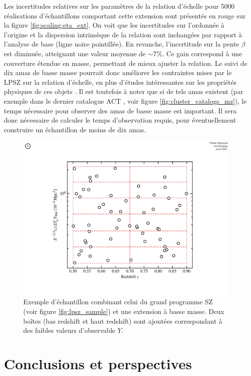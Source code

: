 Les incertitudes relatives sur les paramètres de la relation d'échelle pour 5000 réalisations d'échantillons comportant cette extension sont présentés en rouge sur la figure \ref{fig:scaling:eta_ext}.
On voit que les incertitudes sur l'ordonnée à l'origine et la dispersion intrinsèque de la relation sont inchangées par rapport à l'analyse de base (ligne noire pointillée).
En revanche, l'incertitude sur la pente $\beta$ est diminuée, atteignant une valeur moyenne de $\sim$7\%.
Ce gain correspond à une couverture étendue en masse, permettant de mieux ajuster la relation.
Le suivi de dix amas de basse masse pourrait donc améliorer les contraintes mises par le LPSZ sur la relation d'échelle, en plus d'études intéressantes sur les propriétés physiques de ces objets \cite{keruzore_exploiting_2020}.
Il est toutefois à noter que si de tels amas existent (par exemple dans le dernier catalogue ACT \cite{hilton_atacama_2021}, voir figure \ref{fig:cluster_catalogs_mz}), le temps nécessaire pour observer des amas de basse masse est important.
Il sera donc nécessaire de calculer le temps d'observation requis, pour éventuellement construire un échantillon de moins de dix amas.

\begin{figure}[t]
    \centering
    \includegraphics[width=.6\linewidth]{Figures/Chap_scaling/lowm_bin.pdf}
    \caption{
        Exemple d'échantillon combinant celui du grand programme SZ (voir figure \ref{fig:lpsz_sample}) et une extension à basse masse.
        Deux boîtes (bas redshift et haut redshift) sont ajoutées correspondant à des faibles valeurs d'observable $Y$.
    }
    \label{fig:scaling:lpsz_lowm}
\end{figure}

\section{Conclusions et perspectives}

